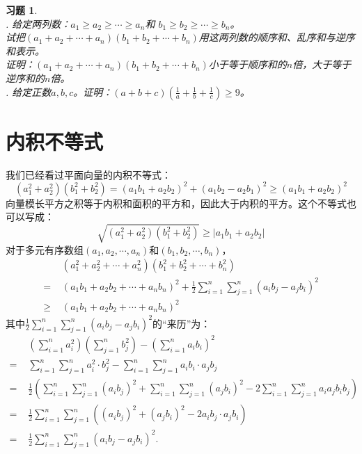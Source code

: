 \documentclass[12pt,UTF8]{ctexbook}
\newtheorem{xt}{习题}[section]
\begin{document}
\begin{xt}    
    \mbox{}\\
    . 给定两列数：$a_1 \geqslant a_2 \geqslant \cdots \geqslant a_n$和
$b_1 \geqslant b_2 \geqslant \cdots \geqslant b_n$。\\
     试把$(a_1 + a_2 + \cdots + a_n)(b_1 + b_2 + \cdots + b_n)$用这两列数的顺序和、乱序和与逆序和表示。\\
     证明：$(a_1 + a_2 + \cdots + a_n)(b_1 + b_2 + \cdots + b_n)$小于等于顺序和的$n$倍，大于等于逆序和的$n$倍。 \\
    . 给定正数$a,b,c$。证明：$(a + b + c)(\frac{1}{a}+\frac{1}{b}+\frac{1}{c}) \geqslant 9$。
\end{xt}

\section{内积不等式}

我们已经看过平面向量的内积不等式：
$$
(a_1^2 + a_2^2)(b_1^2 + b_2^2) = (a_1b_1 + a_2b_2)^2 + (a_1b_2 - a_2b_1)^2 \geqslant (a_1b_1 + a_2b_2)^2
$$
向量模长平方之积等于内积和面积的平方和，因此大于内积的平方。这个不等式也可以写成：
$$
\sqrt{(a_1^2 + a_2^2)(b_1^2 + b_2^2)} \geqslant |a_1b_1 + a_2b_2|
$$
对于多元有序数组$(a_1, a_2, \cdots, a_n)$和$(b_1, b_2, \cdots, b_n)$，
\begin{align*}
&(a_1^2 + a_2^2 + \cdots + a_n^2)(b_1^2 + b_2^2 + \cdots + b_n^2)  \\
=\,\,& (a_1b_1 + a_2b_2 + \cdots + a_nb_n)^2 + \frac{1}{2}\sum_{i=1}^n\sum_{j=1}^n(a_ib_j - a_jb_i)^2  \\
\geqslant\,\,& (a_1b_1 + a_2b_2 + \cdots + a_nb_n)^2  
\end{align*}
其中$\frac{1}{2}\sum_{i=1}^n\sum_{j=1}^n(a_ib_j - a_jb_i)^2$的“来历”为：
\begin{align*}
&\left(\sum_{i=1}^n a_i^2\right) \left(\sum_{j=1}^n b_j^2\right) - \left(\sum_{i=1}^n a_ib_i\right)^2  \\
=\,\,& \sum_{i=1}^n\sum_{j=1}^n a_i^2 \cdot b_j^2 - \sum_{i=1}^n\sum_{j=1}^n a_ib_i\cdot a_jb_j  \\
=\,\,& \frac{1}{2}\left(\sum_{i=1}^n\sum_{j=1}^n (a_ib_j)^2 + \sum_{i=1}^n\sum_{j=1}^n (a_jb_i)^2 -  2 \sum_{i=1}^n\sum_{j=1}^n a_ia_jb_ib_j \right)  \\
=\,\,& \frac{1}{2}\sum_{i=1}^n\sum_{j=1}^n \left( (a_ib_j)^2 + (a_jb_i)^2 -  2 a_ib_j\cdot a_jb_i \right)  \\ 
=\,\,& \frac{1}{2}\sum_{i=1}^n\sum_{j=1}^n \left( a_ib_j - a_jb_i \right)^2.  
\end{align*}
\end{document}

